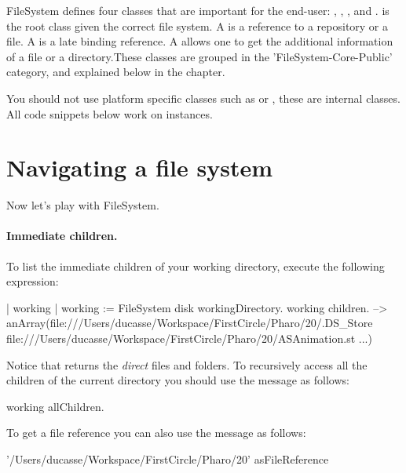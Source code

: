 \documentclass[a4paper,10pt,twoside]{book}
\begin{document}
FileSystem defines four classes that are important for the end-user: , , , and .  is the root class given the correct file system. A  is a reference to a repository or a file. A  is a late binding reference. A  allows one to get the additional information of a file or a directory.These classes are grouped in the 'FileSystem-Core-Public' category, and explained below in the chapter.

You should not use platform specific classes such as  or , these are internal classes. All code snippets below work on  instances.


\section{Navigating a file system}

Now let's play with FileSystem. 

\paragraph{Immediate children.}
To list the immediate children of your working directory, execute the following expression:

\begin{code}{}
| working |
working := FileSystem disk workingDirectory.
working children.
--> anArray(file:///Users/ducasse/Workspace/FirstCircle/Pharo/20/.DS_Store file:///Users/ducasse/Workspace/FirstCircle/Pharo/20/ASAnimation.st ...)
\end{code} 

Notice that  returns the \emph{direct} files and folders. 
To recursively access all the children of the current directory you should use the message  as follows:

\begin{code}{}
working allChildren.
\end{code}


To get a file reference you can also use the  message as follows: 

\begin{code}{}
'/Users/ducasse/Workspace/FirstCircle/Pharo/20' asFileReference
\end{code}
\end{document}
